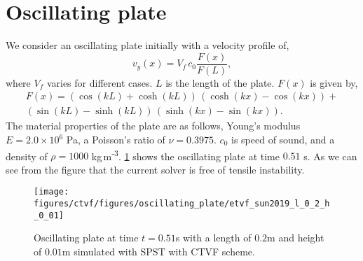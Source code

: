 \FloatBarrier%
\section{Oscillating plate}
\label{sec:oscillating-plate}
We consider an oscillating plate initially with a velocity profile of,
%
\begin{equation*}
  v_y(x) = V_f \, c_0 \frac{F(x)}{F(L)},
\end{equation*}
where $V_f$ varies for different cases. $L$ is the length of the plate. $F(x)$
is given by,
\begin{multline}
  F(x) = (\cos(kL) + \cosh(kL)) \, (\cosh(kx) - \cos(kx)) + \\
  (\sin(kL) - \sinh(kL)) \, (\sinh(kx) - \sin(kx)).
\end{multline}
%
The material properties of the plate are as follows, Young's modulus
$E=2.0\times 10^6$ Pa, a Poisson's ratio of $\nu=0.3975$. $c_0$ is speed of
sound, and a density of $\rho=1000$ kg\,m\textsuperscript{-3}.
\cref{fig:oscillating-plate:etvf-sun2019-l-0-2-h-0-01} shows the oscillating
plate at time $0.51$ s. As we can see from the figure that the current solver is
free of tensile instability.
%
%
\begin{figure}[!htp]
  \centering
  \texttt{[image: figures/ctvf/figures/oscillating\_plate/etvf\_sun2019\_l\_0\_2\_h\_0\_01]}
  \caption{Oscillating plate at time $t=0.51$s with a length of $0.2$m and
    height of $0.01$m simulated with SPST with CTVF scheme.}
\label{fig:oscillating-plate:etvf-sun2019-l-0-2-h-0-01}
\end{figure}
